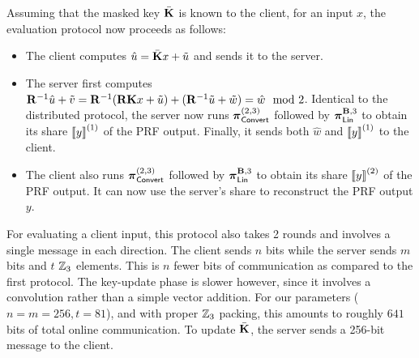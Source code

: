 \noindent Assuming that the masked key $\bar{\mat{K}}$ is known to the client, for an input $x$,  the evaluation protocol now proceeds as follows:
\begin{itemize}
  \item The client computes $\hat{u} = \bar{\mat{K}}x + \tilde{u}$ and sends it to the server.

  \item The server first computes $\mat{R}^{-1}\hat{u} + \tilde{v} = \mat{R}^{-1}(\mat{R}\mat{K}x + \tilde{u}) + (\mat{R}^{-1}\tilde{u} + \tilde{w}) = \hat{w} \mod 2$. Identical to the distributed protocol, the server now runs $\boldsymbol{\pi}_{\textsf{Convert}}^{(2,3)}$ followed by $\prot_\LMap^{\mat{B},3}$ to obtain its share $\left\llbracket y \right\rrbracket^{(1)}$ of the PRF output. Finally, it sends both $\hat{w}$ and $\left\llbracket y \right\rrbracket^{(1)}$ to the client.

  \item The client also runs $\boldsymbol{\pi}_{\textsf{Convert}}^{(2,3)}$ followed by $\prot_\LMap^{\mat{B},3}$ to obtain its share $\left\llbracket y \right\rrbracket^{(2)}$ of the PRF output. It can now use the server's share to reconstruct the PRF output $y$.
\end{itemize}
For evaluating a client input, this protocol also takes 2 rounds and involves a single message in each direction. The client sends $n$ bits while the server sends $m$ bits and $t$ $\mathbb{Z}_3$ elements. This is $n$ fewer bits of communication as compared to the first protocol. The key-update phase is slower however, since it involves a convolution rather than a simple vector addition. For our parameters ($n=m=256, t=81$), and with proper $\mathbb{Z}_3$ packing, this amounts to roughly $641$ bits of total online communication. To update $\bar{\mat{K}}$, the server sends a 256-bit message to the client.

